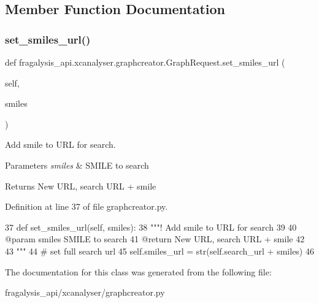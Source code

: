 \subsection{Member Function Documentation}
\mbox{\label{classfragalysis__api_1_1xcanalyser_1_1graphcreator_1_1_graph_request_ac47f4baba7c0cdefd43bb0c7e17646c9}} 
\subsubsection{\texorpdfstring{set\+\_\+smiles\+\_\+url()}{set\_smiles\_url()}}
{\footnotesize\ttfamily def fragalysis\+\_\+api.\+xcanalyser.\+graphcreator.\+Graph\+Request.\+set\+\_\+smiles\+\_\+url (\begin{DoxyParamCaption}\item[{}]{self,  }\item[{}]{smiles }\end{DoxyParamCaption})}



Add smile to U\+RL for search. 


\begin{DoxyParams}{Parameters}
{\em smiles} & S\+M\+I\+LE to search \\
\hline
\end{DoxyParams}
\begin{DoxyReturn}{Returns}
New U\+RL, search U\+RL + smile 
\end{DoxyReturn}


Definition at line 37 of file graphcreator.\+py.


\begin{DoxyCode}
37     \textcolor{keyword}{def }set\_smiles\_url(self, smiles):
38         \textcolor{stringliteral}{"""! Add smile to URL for search}
39 \textcolor{stringliteral}{}
40 \textcolor{stringliteral}{        @param smiles SMILE to search}
41 \textcolor{stringliteral}{        @return New URL, search URL + smile}
42 \textcolor{stringliteral}{        }
43 \textcolor{stringliteral}{        """}
44         \textcolor{comment}{# set full search url}
45         self.smiles\_url = str(self.search\_url + smiles)
46 
\end{DoxyCode}


The documentation for this class was generated from the following file\+:\begin{DoxyCompactItemize}
\item 
fragalysis\+\_\+api/xcanalyser/graphcreator.\+py\end{DoxyCompactItemize}
